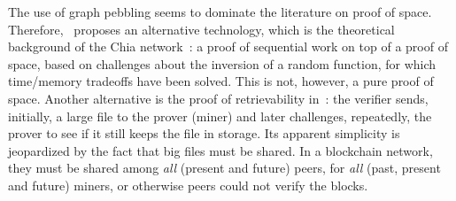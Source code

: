 The use of graph pebbling seems to dominate the literature on proof of space.
Therefore, \cite{AbusalahACKPR17}~proposes an alternative technology, which is the
theoretical background of the Chia network~\cite{CohenP19,Chia}:
a proof of sequential work on top of a proof of space, based on challenges
about the inversion of a random function, for which time/memory tradeoffs have been solved.
This is not, however, a pure proof of space.
Another alternative is the proof of retrievability in~\cite{JuelsK07}: the verifier sends, initially,
a large file to the prover (miner) and later challenges, repeatedly, the prover to see
if it still keeps the file in storage. Its apparent simplicity
is jeopardized by the fact that big files must be shared.
In a blockchain network, they must be shared among \emph{all} (present and future)
peers, for \emph{all} (past, present and future) miners, or otherwise peers could not verify the blocks.

